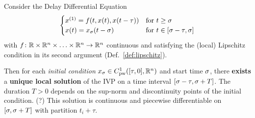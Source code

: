     \begin{theorem}\label{thm:solution-existence}
        Consider the Delay Differential Equation
        \begin{equation}
            \begin{cases}
                \D{x} = f(t,x(t),x(t-\tau)) & \text{for } t\geq\tzero\\
                x(t) = x_\tzero(t-\tzero)   & \text{for } t\in [\tzero-\tau,\tzero]
            \end{cases}
        \end{equation}
        with $f\colon\mathbb{R}\times\mathbb{R}^n\times\ldots\times\mathbb{R}^n\to\mathbb{R}^n$ continuous and satisfying the (local) Lipschitz condition in its second argument (Def.~\ref{def:lipschitz}).


        Then for each \emph{initial condition} $x_{\tzero}\in\statespace[\tau]$ and start time $\sigma$, there \textbf{exists} a \textbf{unique local solution} of the IVP on a time interval $[\sigma-\tau, \sigma+T]$. The duration $T>0$ depends on the sup-norm and discontinuity points of the initial condition. (?)
        This solution is continuous and piecewise differentiable on $[\sigma,\sigma+T]$ with partition $t_i+\tau$.
    \end{theorem}

